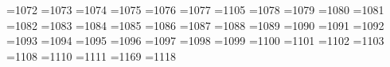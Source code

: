 =1072 %
{}=1073 %
{}=1074 %
{}=1075 %
{}=1076 %
{}=1077 %
{}=1105 %
{}=1078 %
{}=1079 %
{}=1080 %
{}=1081 %
{}=1082 %
{}=1083 %
{}=1084 %
{}=1085 %
{}=1086 %
{}=1087 %
{}=1088 %
{}=1089 %
{}=1090 %
{}=1091 %
{}=1092 %
{}=1093 %
{}=1094 %
{}=1095 %
{}=1096 %
{}=1097 %
{}=1098 %
{}=1099 %
{}=1100 %
{}=1101 %
{}=1102 %
{}=1103 %
=1108 %
{}=1110 %
{}=1111 %
{}=1169 %
{}=1118 %
